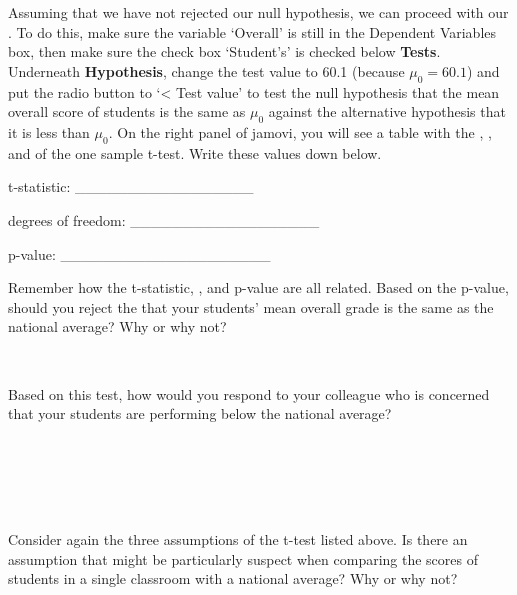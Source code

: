 \documentclass[
  openany]{krantz}
\begin{document}
Assuming that we have not rejected our null hypothesis, we can proceed with our .
To do this, make sure the variable `Overall' is still in the Dependent Variables box, then make sure the check box `Student's' is checked below \textbf{Tests}.
Underneath \textbf{Hypothesis}, change the test value to 60.1 (because \(\mu_{0} = 60.1\)) and put the radio button to `\textless{} Test value' to test the null hypothesis that the mean overall score of students is the same as \(\mu_{0}\) against the alternative hypothesis that it is less than \(\mu_{0}\).
On the right panel of jamovi, you will see a table with the , , and  of the one sample t-test.
Write these values down below.

\newpage

t-statistic: \_\_\_\_\_\_\_\_\_\_\_\_\_\_\_\_\_

degrees of freedom: \_\_\_\_\_\_\_\_\_\_\_\_\_\_\_\_\_\_

p-value: \_\_\_\_\_\_\_\_\_\_\_\_\_\_\_\_\_\_\_\_

Remember how the t-statistic, , and p-value are all related.
Based on the p-value, should you reject the  that your students' mean overall grade is the same as the national average?
Why or why not?

\begin{verbatim}


\end{verbatim}

Based on this test, how would you respond to your colleague who is concerned that your students are performing below the national average?

\begin{verbatim}





\end{verbatim}

Consider again the three assumptions of the t-test listed above.
Is there an assumption that might be particularly suspect when comparing the scores of students in a single classroom with a national average?
Why or why not?

\begin{verbatim}





\end{verbatim}
\end{document}
